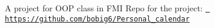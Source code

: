 A project for OOP class in FMI  Repo for the project\+: \href{https://github.com/bobig6/Personal_calendar}{\texttt{ https\+://github.\+com/bobig6/\+Personal\+\_\+calendar}} 